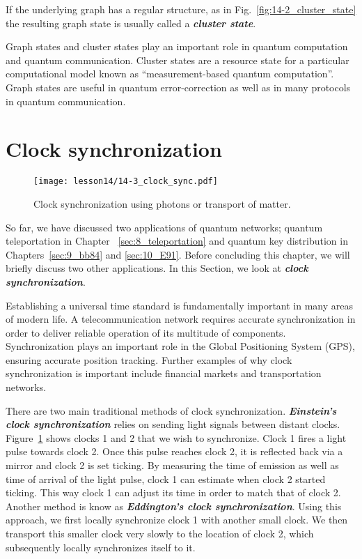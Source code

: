 If the underlying graph has a regular structure, as in Fig.~\ref{fig:14-2_cluster_state} the resulting graph state is usually called a \textbf{\textit{cluster state}}.

Graph states and cluster states play an important role in quantum computation and quantum communication.
Cluster states are a resource state for a particular computational model known as ``measurement-based quantum computation''.
Graph states are useful in quantum error-correction as well as in many protocols in quantum communication.





\section{Clock synchronization}
\label{sec:14-3_clock_sync}

\begin{figure}[t]
    \centering
    \texttt{[image: lesson14/14-3\_clock\_sync.pdf]}
    \caption[Clock synchronization.]{Clock synchronization using photons or transport of matter.}
    \label{fig:14-3_clock_sync}
\end{figure}

So far, we have discussed two applications of quantum networks; quantum teleportation in Chapter ~\ref{sec:8_teleportation} and quantum key distribution in Chapters~\ref{sec:9_bb84} and \ref{sec:10_E91}.
Before concluding this chapter, we will briefly discuss two other applications.
In this Section, we look at \textbf{\textit{clock synchronization}}.

Establishing a universal time standard is fundamentally important in many areas of modern life.
A telecommunication network requires accurate synchronization in order to deliver reliable operation of its multitude of components.
Synchronization plays an important role in the Global Positioning System (GPS), ensuring accurate position tracking.
Further examples of why clock synchronization is important include financial markets and transportation networks.

There are two main traditional methods of clock synchronization.
\textbf{\textit{Einstein's clock synchronization}} relies on sending light signals between distant clocks.
Figure~\ref{fig:14-3_clock_sync} shows clocks 1 and 2 that we wish to synchronize.
Clock 1 fires a light pulse towards clock 2.
Once this pulse reaches clock 2, it is reflected back via a mirror and clock 2 is set ticking.
By measuring the time of emission as well as time of arrival of the light pulse, clock 1 can estimate when clock 2 started ticking.
This way clock 1 can adjust its time in order to match that of clock 2.
Another method is know as \textbf{\textit{Eddington's clock synchronization}}.
Using this approach, we first locally synchronize clock 1 with another small clock.
We then transport this smaller clock very slowly to the location of clock 2, which subsequently locally synchronizes itself to it.

